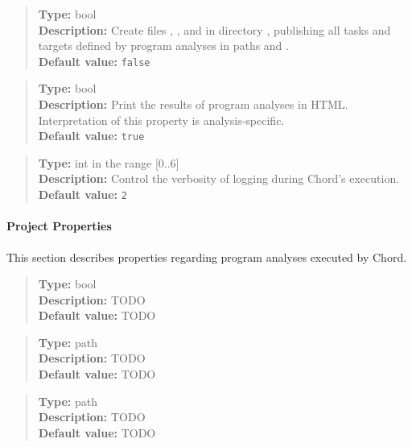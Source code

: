 \noindent {}
\begin{quote}
{\bf Type:} bool \\
{\bf Description:} Create files , , and  in directory , publishing all tasks and targets defined by program analyses in paths  and .  \\
{\bf Default value:} {\tt false}
\end{quote}

\noindent {}
\begin{quote}
{\bf Type:} bool \\
{\bf Description:} Print the results of program analyses in HTML.  Interpretation of this property is analysis-specific.  \\
{\bf Default value:} {\tt true}
\end{quote}

\noindent {}
\begin{quote}
{\bf Type:} int in the range [0..6]  \\
{\bf Description:} Control the verbosity of logging during Chord's execution.  \\
{\bf Default value:} {\tt 2}
\end{quote}

\paragraph{Project Properties}

This section describes properties regarding program analyses executed by Chord.

\noindent {}
\begin{quote}
{\bf Type:} bool \\
{\bf Description:} TODO \\
{\bf Default value:} TODO
\end{quote}

\noindent {}
\begin{quote}
{\bf Type:} path \\
{\bf Description:} TODO \\
{\bf Default value:} TODO
\end{quote}

\noindent {}
\begin{quote}
{\bf Type:} path \\
{\bf Description:} TODO \\
{\bf Default value:} TODO
\end{quote}

